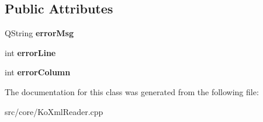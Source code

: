 \subsection*{Public Attributes}
\begin{DoxyCompactItemize}
\item 
\hypertarget{classKoXmlHandler_a4e2a87f55629414eb0bbcf73fe013537}{
QString {\bfseries errorMsg}}
\label{classKoXmlHandler_a4e2a87f55629414eb0bbcf73fe013537}

\item 
\hypertarget{classKoXmlHandler_a4d103509a7f96fc9e0fb5afab27699d3}{
int {\bfseries errorLine}}
\label{classKoXmlHandler_a4d103509a7f96fc9e0fb5afab27699d3}

\item 
\hypertarget{classKoXmlHandler_a19ae6385d8aaa106a0783c87b2bf50ee}{
int {\bfseries errorColumn}}
\label{classKoXmlHandler_a19ae6385d8aaa106a0783c87b2bf50ee}

\end{DoxyCompactItemize}


The documentation for this class was generated from the following file:\begin{DoxyCompactItemize}
\item 
src/core/KoXmlReader.cpp\end{DoxyCompactItemize}
